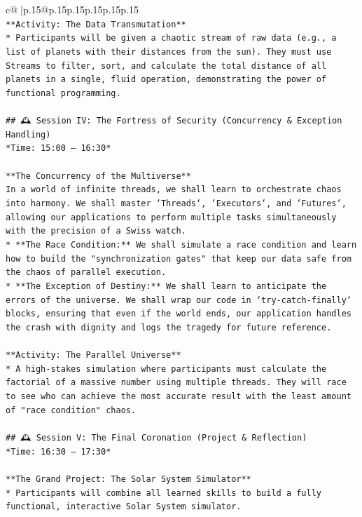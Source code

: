 \documentclass{article}
\begin{document}
{\begin{supertabular}{c@{$\;$}|p{.15\linewidth}@{}p{.15\linewidth}p{.15\linewidth}p{.15\linewidth}p{.15\linewidth}p{.15\linewidth}}
{{{\\ 
\texttt{**Activity: The Data Transmutation**} \\
\texttt{*   Participants will be given a chaotic stream of raw data (e.g., a list of planets with their distances from the sun). They must use Streams to filter, sort, and calculate the total distance of all planets in a single, fluid operation, demonstrating the power of functional programming.} \\
\\ 
\texttt{\#\# 🕰️ Session IV: The Fortress of Security (Concurrency \& Exception Handling)} \\
\texttt{*Time: 15:00 – 16:30*} \\
\\ 
\texttt{**The Concurrency of the Multiverse**} \\
\texttt{In a world of infinite threads, we shall learn to orchestrate chaos into harmony. We shall master `Threads`, `Executors`, and `Futures`, allowing our applications to perform multiple tasks simultaneously with the precision of a Swiss watch.} \\
\texttt{*   **The Race Condition:** We shall simulate a race condition and learn how to build the "synchronization gates" that keep our data safe from the chaos of parallel execution.} \\
\texttt{*   **The Exception of Destiny:** We shall learn to anticipate the errors of the universe. We shall wrap our code in `try{-}catch{-}finally` blocks, ensuring that even if the world ends, our application handles the crash with dignity and logs the tragedy for future reference.} \\
\\ 
\texttt{**Activity: The Parallel Universe**} \\
\texttt{*   A high{-}stakes simulation where participants must calculate the factorial of a massive number using multiple threads. They will race to see who can achieve the most accurate result with the least amount of "race condition" chaos.} \\
\\ 
\texttt{\#\# 🕰️ Session V: The Final Coronation (Project \& Reflection)} \\
\texttt{*Time: 16:30 – 17:30*} \\
\\ 
\texttt{**The Grand Project: The Solar System Simulator**} \\
\texttt{*   Participants will combine all learned skills to build a fully functional, interactive Solar System simulator.} \\
}}}
\end{supertabular}}
\end{document}
